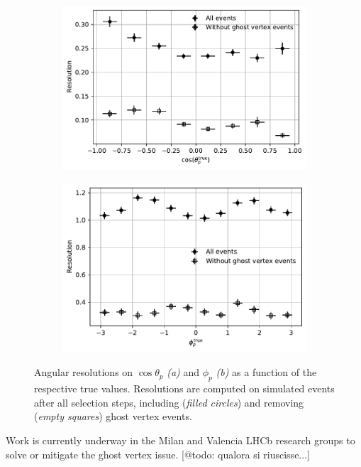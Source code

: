 \begin{figure}[t]
	\centering
	\begin{subfigure}{.45\textwidth}
		\includegraphics[width=\textwidth]{graphics/05-angular_distributions/MCRECO_p_theta_resolution_nocross.pdf}
		\caption{}
		\label{fig:4:theta_resolution_nocross}
	\end{subfigure}
	\begin{subfigure}{.45\textwidth}
		\includegraphics[width=\textwidth]{graphics/05-angular_distributions/MCRECO_p_phi_resolution_nocross.pdf}
		\caption{}
		\label{fig:5:phi_resolution_nocross}
	\end{subfigure}
	\caption{Angular resolutions on $\cos\theta_p$ \textit{(a)} and $\phi_p$ \textit{(b)} as a function of the respective true values. Resolutions are computed on simulated \demonstratorshort events after all selection steps, including (\textit{filled circles}) and removing (\textit{empty squares}) \lambdadecay ghost vertex events.}
	\label{fig:4:resolution_nocross}
\end{figure}

Work is currently underway in the Milan and Valencia LHCb research groups to solve or mitigate the ghost vertex issue.
[@todo: qualora si riuscisse...]